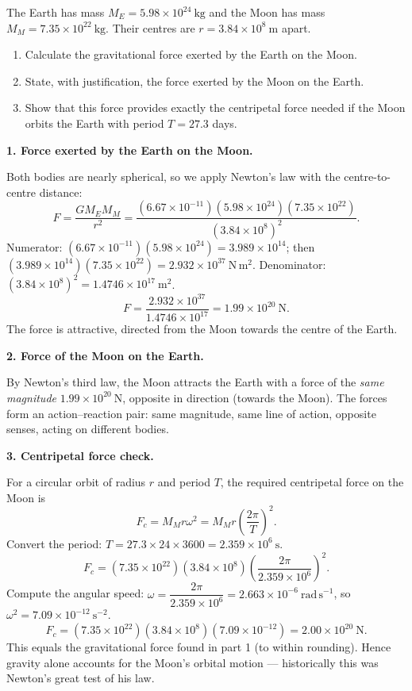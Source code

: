 \documentclass[11pt]{article}
\newcommand{\cle}[1]{{\popxbold\color{popdark}#1}}
\begin{document}
\begin{exoresolu}
The Earth has mass $M_E = 5.98\times 10^{24}\ \mathrm{kg}$ and the Moon has mass $M_M = 7.35\times 10^{22}\ \mathrm{kg}$. Their centres are $r = 3.84\times 10^{8}\ \mathrm{m}$ apart.
\begin{enumerate}
\item Calculate the gravitational force exerted by the Earth on the Moon.
\item State, with justification, the force exerted by the Moon on the Earth.
\item Show that this force provides exactly the centripetal force needed if the Moon orbits the Earth with period $T = 27.3$ days.
\end{enumerate}
\tcblower
\textbf{1. Force exerted by the Earth on the Moon.}

Both bodies are nearly spherical, so we apply Newton's law with the centre-to-centre distance:
\[ F = \frac{G M_E M_M}{r^{2}} = \frac{(6.67\times 10^{-11})(5.98\times 10^{24})(7.35\times 10^{22})}{(3.84\times 10^{8})^{2}}. \]
Numerator: $(6.67\times 10^{-11})(5.98\times 10^{24}) = 3.989\times 10^{14}$; then $(3.989\times 10^{14})(7.35\times 10^{22}) = 2.932\times 10^{37}\ \mathrm{N\,m^{2}}$.
Denominator: $(3.84\times 10^{8})^{2} = 1.4746\times 10^{17}\ \mathrm{m^{2}}$.
\[ F = \frac{2.932\times 10^{37}}{1.4746\times 10^{17}} = 1.99\times 10^{20}\ \mathrm{N}. \]
The force is attractive, directed from the Moon towards the centre of the Earth.

\textbf{2. Force of the Moon on the Earth.}

By Newton's \cle{third law}, the Moon attracts the Earth with a force of the \emph{same magnitude} $1.99\times 10^{20}\ \mathrm{N}$, opposite in direction (towards the Moon). The forces form an action–reaction pair: same magnitude, same line of action, opposite senses, acting on different bodies.

\textbf{3. Centripetal force check.}

For a circular orbit of radius $r$ and period $T$, the required centripetal force on the Moon is
\[ F_c = M_M r \omega^{2} = M_M r \left(\frac{2\pi}{T}\right)^{2}. \]
Convert the period: $T = 27.3\times 24\times 3600 = 2.359\times 10^{6}\ \mathrm{s}$.
\[ F_c = (7.35\times 10^{22})(3.84\times 10^{8})\left(\frac{2\pi}{2.359\times 10^{6}}\right)^{2}. \]
Compute the angular speed: $\omega = \dfrac{2\pi}{2.359\times 10^{6}} = 2.663\times 10^{-6}\ \mathrm{rad\,s^{-1}}$, so $\omega^{2} = 7.09\times 10^{-12}\ \mathrm{s^{-2}}$.
\[ F_c = (7.35\times 10^{22})(3.84\times 10^{8})(7.09\times 10^{-12}) = 2.00\times 10^{20}\ \mathrm{N}. \]
This equals the gravitational force found in part 1 (to within rounding). Hence gravity alone accounts for the Moon's orbital motion — historically this was Newton's great test of his law.
\end{exoresolu}
\end{document}
